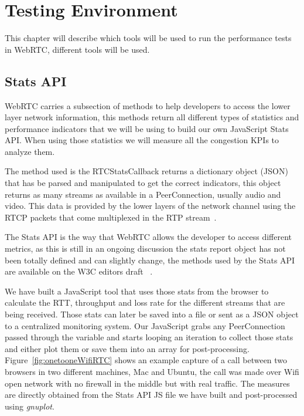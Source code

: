 \section{Testing Environment}


\thispagestyle{empty}

This chapter will describe which tools will be used to run the performance tests in WebRTC, different tools will be used.

\subsection{Stats API}

WebRTC carries a subsection of methods to help developers to access the lower layer network information, this methods return all different types of statistics and performance indicators that we will be using to build our own JavaScript Stats API. When using those statistics we will measure all the congestion KPIs to analyze them.

The method used is the RTCStatsCallback returns a dictionary object (JSON) that has be parsed and manipulated to get the correct indicators, this object returns as many streams as available in a PeerConnection, usually audio and video. This data is provided by the lower layers of the network channel using the RTCP packets that come multiplexed in the RTP stream~\cite{rtpusageIETF}.

The Stats API is the way that WebRTC allows the developer to access different metrics, as this is still in an ongoing discussion the stats report object has not been totally defined and can slightly change, the methods used by the Stats API are available on the W3C editors draft ~\cite{editorWebRTCdraft}. 

We have built a JavaScript tool that uses those stats from the browser to calculate the RTT, throughput and loss rate for the different streams that are being received. Those stats can later be saved into a file or sent as a JSON object to a centralized monitoring system. Our JavaScript grabs any PeerConnection passed through the variable and starts looping an iteration to collect those stats and either plot them or save them into an array for post-processing. 

Figure~\ref{fig:onetooneWifiRTC} shows an example capture of a call between two browsers in two different machines, Mac and Ubuntu, the call was made over Wifi open network with no firewall in the middle but with real traffic. The measures are directly obtained from the Stats API JS file we have built and post-processed using {\it gnuplot}.


